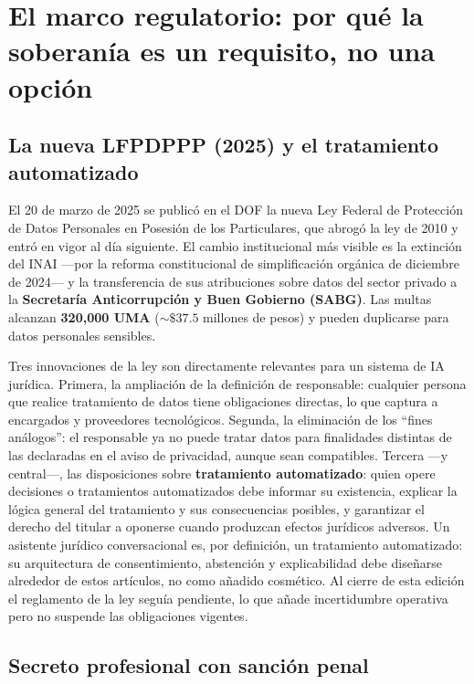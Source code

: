 \section{El marco regulatorio: por qué la soberanía es un requisito, no una opción}\label{sec:marco}

\subsection{La nueva LFPDPPP (2025) y el tratamiento automatizado}

El 20 de marzo de 2025 se publicó en el DOF la nueva Ley Federal de Protección de Datos Personales en Posesión de los Particulares, que abrogó la ley de 2010 y entró en vigor al día siguiente.\cite{lfpdppp} El cambio institucional más visible es la extinción del INAI ---por la reforma constitucional de simplificación orgánica de diciembre de 2024--- y la transferencia de sus atribuciones sobre datos del sector privado a la \textbf{Secretaría Anticorrupción y Buen Gobierno (SABG)}.\cite{ccn2025,lfpdppp} Las multas alcanzan \textbf{320,000 UMA} ($\sim\$37.5$ millones de pesos) y pueden duplicarse para datos personales sensibles.\cite{kyc2026}

Tres innovaciones de la ley son directamente relevantes para un sistema de IA jurídica. Primera, la ampliación de la definición de responsable: cualquier persona que realice tratamiento de datos tiene obligaciones directas, lo que captura a encargados y proveedores tecnológicos.\cite{cosio2026} Segunda, la eliminación de los ``fines análogos'': el responsable ya no puede tratar datos para finalidades distintas de las declaradas en el aviso de privacidad, aunque sean compatibles.\cite{ccn2025} Tercera ---y central---, las disposiciones sobre \textbf{tratamiento automatizado}: quien opere decisiones o tratamientos automatizados debe informar su existencia, explicar la lógica general del tratamiento y sus consecuencias posibles, y garantizar el derecho del titular a oponerse cuando produzcan efectos jurídicos adversos.\cite{cosio2026} Un asistente jurídico conversacional es, por definición, un tratamiento automatizado: su arquitectura de consentimiento, abstención y explicabilidad debe diseñarse alrededor de estos artículos, no como añadido cosmético. Al cierre de esta edición el reglamento de la ley seguía pendiente, lo que añade incertidumbre operativa pero no suspende las obligaciones vigentes.\cite{cosio2026}

\subsection{Secreto profesional con sanción penal}

